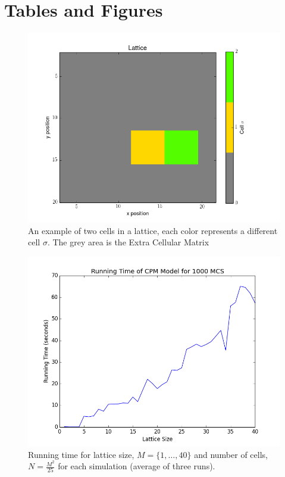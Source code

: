 \documentclass[12pt]{article}
\begin{document}
\pagebreak
\section{Tables and Figures}

\begin{figure}[H]
	\centering
	\includegraphics[scale=0.5]{img/basic}
	\caption{An example of two cells in a lattice, each color represents a different cell $\sigma$. The grey area is the Extra Cellular Matrix}
	\label{basic}
\end{figure}

\begin{figure}[H]
	\centering
	\includegraphics[scale=0.5]{img/runningtime}
	\caption{Running time for lattice size, $M =\{1,\ldots, 40\}$ and number of cells, $N=\frac{M^2}{25}$ for each simulation (average of three runs).}
	\label{runningtime}
\end{figure}
\end{document}
